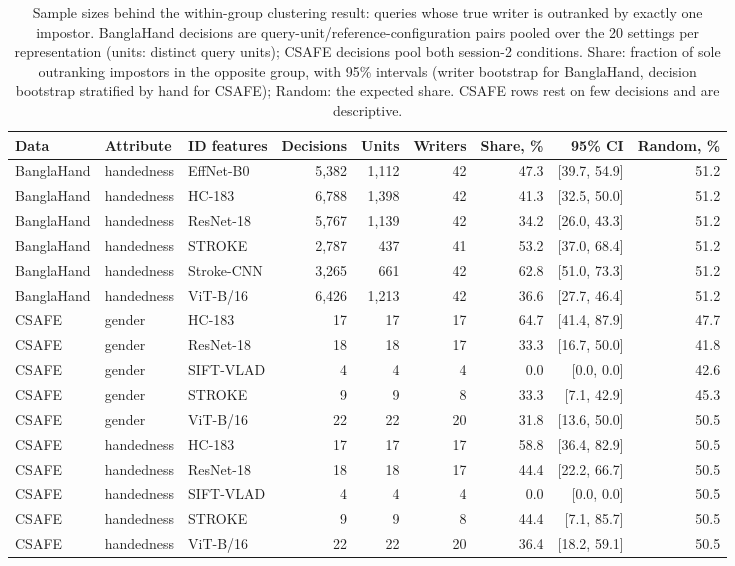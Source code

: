 \begin{table}[ht]
\caption{Sample sizes behind the within-group clustering result: queries whose true writer is outranked by exactly one impostor. BanglaHand decisions are query-unit/reference-configuration pairs pooled over the 20 settings per representation (units: distinct query units); CSAFE decisions pool both session-2 conditions. Share: fraction of sole outranking impostors in the opposite group, with 95\% intervals (writer bootstrap for BanglaHand, decision bootstrap stratified by hand for CSAFE); Random: the expected share. CSAFE rows rest on few decisions and are descriptive.}\label{tab:counts}
\centering\footnotesize\setlength{\tabcolsep}{3.5pt}
\begin{tabular}{lllrrrrrr}\toprule
Data & Attribute & ID features & Decisions & Units & Writers & Share, \% & 95\% CI & Random, \%\\\midrule
BanglaHand & handedness & EffNet-B0 & 5,382 & 1,112 & 42 & 47.3 & [39.7, 54.9] & 51.2 \\
BanglaHand & handedness & HC-183 & 6,788 & 1,398 & 42 & 41.3 & [32.5, 50.0] & 51.2 \\
BanglaHand & handedness & ResNet-18 & 5,767 & 1,139 & 42 & 34.2 & [26.0, 43.3] & 51.2 \\
BanglaHand & handedness & STROKE & 2,787 & 437 & 41 & 53.2 & [37.0, 68.4] & 51.2 \\
BanglaHand & handedness & Stroke-CNN & 3,265 & 661 & 42 & 62.8 & [51.0, 73.3] & 51.2 \\
BanglaHand & handedness & ViT-B/16 & 6,426 & 1,213 & 42 & 36.6 & [27.7, 46.4] & 51.2 \\
\midrule
CSAFE & gender & HC-183 & 17 & 17 & 17 & 64.7 & [41.4, 87.9] & 47.7 \\
CSAFE & gender & ResNet-18 & 18 & 18 & 17 & 33.3 & [16.7, 50.0] & 41.8 \\
CSAFE & gender & SIFT-VLAD & 4 & 4 & 4 & 0.0 & [0.0, 0.0] & 42.6 \\
CSAFE & gender & STROKE & 9 & 9 & 8 & 33.3 & [7.1, 42.9] & 45.3 \\
CSAFE & gender & ViT-B/16 & 22 & 22 & 20 & 31.8 & [13.6, 50.0] & 50.5 \\
\midrule
CSAFE & handedness & HC-183 & 17 & 17 & 17 & 58.8 & [36.4, 82.9] & 50.5 \\
CSAFE & handedness & ResNet-18 & 18 & 18 & 17 & 44.4 & [22.2, 66.7] & 50.5 \\
CSAFE & handedness & SIFT-VLAD & 4 & 4 & 4 & 0.0 & [0.0, 0.0] & 50.5 \\
CSAFE & handedness & STROKE & 9 & 9 & 8 & 44.4 & [7.1, 85.7] & 50.5 \\
CSAFE & handedness & ViT-B/16 & 22 & 22 & 20 & 36.4 & [18.2, 59.1] & 50.5 \\
\bottomrule
\end{tabular}
\end{table}
